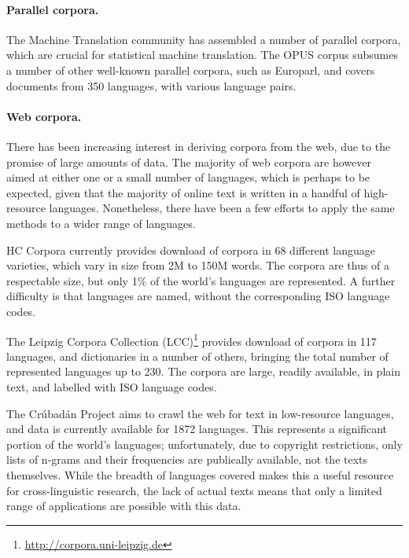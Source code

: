 
\paragraph{Parallel corpora.}

The Machine Translation community has assembled a number of parallel corpora, which are crucial for statistical machine translation. The OPUS corpus \cite{tiedemann2012opus} subsumes a number of other well-known parallel corpora, such as Europarl, and covers documents from 350 languages, with various language pairs.  


\paragraph{Web corpora.}

There has been increasing interest in deriving corpora from the web, due to the promise of large amounts of data.  The majority of web corpora are however aimed at either one or a small number of languages, which is perhaps to be expected, given that the majority of online text is written in a handful of high-resource languages.  Nonetheless, there have been a few efforts to apply the same methods to a wider range of languages.

HC Corpora currently provides download of corpora in 68 different language varieties, which vary in size from 2M to 150M words. The corpora are thus of a respectable size, but only 1\% of the world's languages are represented.  A further difficulty is that languages are named, without the corresponding ISO language codes.

The Leipzig Corpora Collection (LCC)\footnote{\url{http://corpora.uni-leipzig.de}} \cite{biemann2007leipzig} provides download of corpora in 117 languages, and dictionaries in a number of others, bringing the total number of represented languages up to 230. The corpora are large, readily available, in plain text, and labelled with ISO language codes.

The Crúbadán Project aims to crawl the web for text in low-resource languages, and data is currently available for 1872 languages.  This represents a significant portion of the world's languages; unfortunately, due to copyright restrictions, only lists of n-grams and their frequencies are publically available, not the texts themselves.  While the breadth of languages covered makes this a useful resource for cross-linguistic research, the lack of actual texts means that only a limited range of applications are possible with this data.

